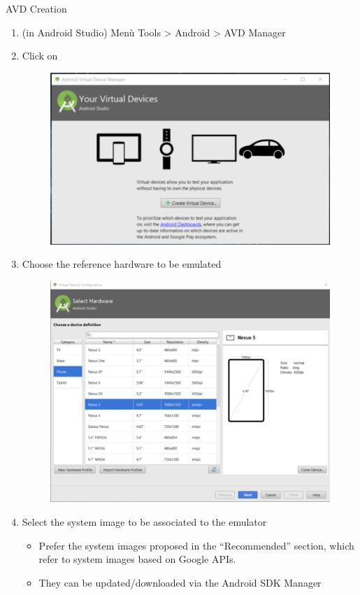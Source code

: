 \documentclass{beamer}
\begin{document}
  \begin{frame}[allowframebreaks]{AVD Creation}
    \begin{enumerate}
      \item (in Android Studio) Menù Tools > Android > AVD Manager
      \item Click on 
      \begin{figure}
        \includegraphics[width=0.8\linewidth]{figures/avd-1.png}
      \end{figure}
      \item Choose the reference hardware to be emulated
      \begin{figure}
        \includegraphics[width=0.7\linewidth]{figures/avd-2.png}
      \end{figure}
        \item Select the system image to be associated to the emulator
      \begin{itemize}
        \item Prefer the system images proposed in the “Recommended” section,
        which refer to system images based on Google APIs. 
        \item They can be updated/downloaded via the Android SDK Manager

\end{itemize}
\end{enumerate}
\end{frame}
\end{document}
